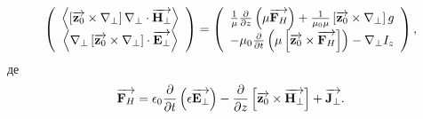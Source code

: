 %
%
\begin{equation} \label{eq:wboHinit}
\left( \begin{array}{c} 
\left< \left[ \overrightarrow{\mathbf z_0} \times \nabla_\perp \right] \nabla_\perp \cdot \overrightarrow{\mathbf H_\perp} \right> \\
\left< \nabla_\perp \left[ \overrightarrow{\mathbf z_0} \times \nabla_\perp \right] \cdot \overrightarrow{\mathbf E_\perp} \right> \\
\end{array} \right) = \left( \begin{array}{c} 
\frac{1}{\mu} \frac{\partial }{\partial z} \left( \mu \overrightarrow{\mathbf F_H} \right) +
\frac{1}{\mu_0 \mu} \left[ \overrightarrow{\mathbf z_0} \times \nabla_\perp \right] g \\
- \mu_0 \frac{\partial }{\partial t} \left( \mu \left[ \overrightarrow{\mathbf z_0} \times \overrightarrow{\mathbf F_H} \right] \right) -
\nabla_\perp I_z 
\end{array} \right),
\end{equation}
%
де
%
\begin{equation} \label{eq:F_H}
\overrightarrow{\mathbf F_H} = \epsilon_0 \frac{\partial }{\partial t} \left( \epsilon \overrightarrow{\mathbf E_\perp} \right) - 
\frac{\partial }{\partial z} \left[ \overrightarrow{\mathbf z_0} \times \overrightarrow{\mathbf H_\perp} \right] + \overrightarrow{\mathbf J_\perp}.
\end{equation}

